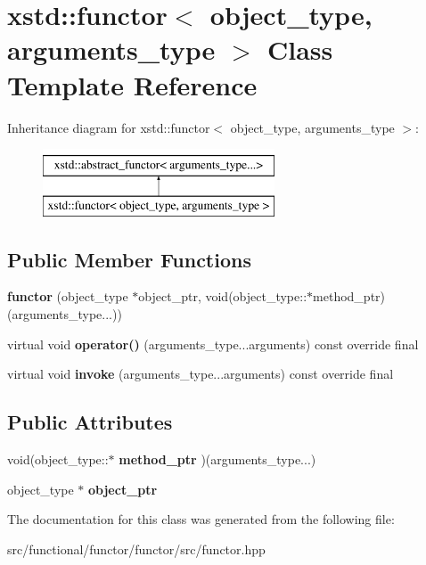 \hypertarget{classxstd_1_1functor}{\section{xstd\-:\-:functor$<$ object\-\_\-type, arguments\-\_\-type $>$ Class Template Reference}
\label{classxstd_1_1functor}
}
Inheritance diagram for xstd\-:\-:functor$<$ object\-\_\-type, arguments\-\_\-type $>$\-:\begin{figure}[H]
\begin{center}
\leavevmode
\includegraphics[height=2.000000cm]{classxstd_1_1functor}
\end{center}
\end{figure}
\subsection*{Public Member Functions}
\begin{DoxyCompactItemize}
\item 
\hypertarget{classxstd_1_1functor_aed2d510d4df5f6bb33d06370fbfa5fb8}{{\bfseries functor} (object\-\_\-type $\ast$object\-\_\-ptr, void(object\-\_\-type\-::$\ast$method\-\_\-ptr)(arguments\-\_\-type...))}\label{classxstd_1_1functor_aed2d510d4df5f6bb33d06370fbfa5fb8}

\item 
\hypertarget{classxstd_1_1functor_aeb8b8bd83b493e203d526dbf6b0c4920}{virtual void {\bfseries operator()} (arguments\-\_\-type...\-arguments) const override final}\label{classxstd_1_1functor_aeb8b8bd83b493e203d526dbf6b0c4920}

\item 
\hypertarget{classxstd_1_1functor_aa40709e615299c2c2d05c8c21c7ace66}{virtual void {\bfseries invoke} (arguments\-\_\-type...\-arguments) const override final}\label{classxstd_1_1functor_aa40709e615299c2c2d05c8c21c7ace66}

\end{DoxyCompactItemize}
\subsection*{Public Attributes}
\begin{DoxyCompactItemize}
\item 
\hypertarget{classxstd_1_1functor_a673d0ccf7da14d0d7f4726bbdf8af8a4}{void(object\-\_\-type\-::$\ast$ {\bfseries method\-\_\-ptr} )(arguments\-\_\-type...)}\label{classxstd_1_1functor_a673d0ccf7da14d0d7f4726bbdf8af8a4}

\item 
\hypertarget{classxstd_1_1functor_a919d42ea50702cf2ff02360f175b02ad}{object\-\_\-type $\ast$ {\bfseries object\-\_\-ptr}}\label{classxstd_1_1functor_a919d42ea50702cf2ff02360f175b02ad}

\end{DoxyCompactItemize}


The documentation for this class was generated from the following file\-:\begin{DoxyCompactItemize}
\item 
src/functional/functor/functor/src/functor.\-hpp\end{DoxyCompactItemize}
